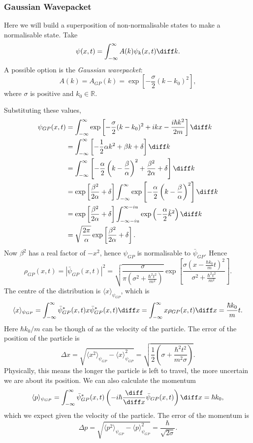 \documentclass[12pt]{article}
\begin{document}
\subsubsection{Gaussian Wavepacket}%
\label{subsub:gaussian_wavepacket}

Here we will build a superposition of non-normalisable states to make a normalisable state. Take
\[
	\psi(x, t) = \int_{-\infty}^{\infty} A(k) \psi_k(x, t) \diff k
.\]
A possible option is the \textit{Gaussian wavepacket}:
\[
	A(k) = A_{GP}(k) = \exp \left[ - \frac{\sigma}{2} (k - k_0)^2 \right]
,\]
where $\sigma$ is positive and $k_0 \in \mathbb{R}$.

Substituting these values,
\begin{align*}
	\psi_{GP}(x, t) &= \int_{-\infty}^{\infty} \exp \left[ - \frac{\sigma}{2}(k - k_0)^2 + i k x - \frac{i \hbar k^2}{2m} \right]\diff k \\
			&= \int_{-\infty}^{\infty} \left[-\frac{1}{2}\alpha k^2 + \beta k + \delta\right]\diff k \\
			&= \int_{-\infty}^{\infty} \left[ - \frac{\alpha}{2}\left(k - \frac{\beta}{\alpha}\right)^2 + \frac{\beta^2}{2\alpha} + \delta\right] \diff k \\
			&= \exp\left[ \frac{\beta^2}{2\alpha} + \delta \right] \int_{-\infty}^{\infty} \exp \left[- \frac{\alpha}{2} \left(k - \frac{\beta}{\alpha}\right)^2\right]\diff k \\
			&= \exp \left[ \frac{\beta^2}{2\alpha} + \delta \right] \int_{-\infty - iu}^{\infty - iu} \exp\left( - \frac{\alpha}{2} \tilde k^2\right) \diff k \\
			&= \sqrt{\frac{2\pi}{\alpha}} \exp\left[\frac{\beta^2}{2\alpha} + \delta\right].
\end{align*}
Now $\beta^2$ has a real factor of $-x^2$, hence $\psi_{GP}$ is normalisable to $\bar \psi_{GP}$. Hence
\[
	\rho_{GP}(x,t) = |\bar\psi_{GP}(x, t)|^2 = \sqrt{\frac{\sigma}{\pi(\sigma^2 + \frac{\hbar^2t^2}{m^2})}} \exp\left[\frac{\sigma(x - \frac{\hbar k_0}{m}t)^2}{\sigma^2 + \frac{\hbar^2t^2}{m^2}} \right]
.\]
The centre of the distribution is $\langle x \rangle_{\psi_{GP}}$, which is
\[
	\langle x \rangle_{\psi_{GP}} = \int_{-\infty}^{\infty} \bar \psi^{\ast}_{GP}(x, t) x \bar \psi_{GP}^{\ast}(x, t) \diff x = \int_{-\infty}^{\infty} x \rho_{GP}(x, t) \diff x = \frac{\hbar k_0}{m}t
.\]
Here $\hbar k_0/m$ can be though of as the velocity of the particle. The error of the position of the particle is
\[
	\Delta x = \sqrt{\langle x^2 \rangle_{\psi_{GP}} - \langle x \rangle^2_{\psi_{GP}}} = \sqrt{\frac{1}{2} \left(\sigma + \frac{\hbar^2t^2}{m^2 \sigma}\right)}
.\]
Physically, this means the longer the particle is left to travel, the more uncertain we are about its position. We can also calculate the momentum
\[
	\langle p \rangle_{\psi_{GP}} = \int_{-\infty}^{\infty} \bar \psi_{GP}^{\ast}(x, t) \left( - i \hbar \frac{\diff}{\diff x} \bar \psi_{GP}(x, t) \right) \diff x = \hbar k_0
,\]
which we expect given the velocity of the particle. The error of the momentum is
\[
	\Delta p = \sqrt{\langle p^2 \rangle_{\psi_{GP}} - \langle p \rangle_{\psi_{GP}}^{2}} = \frac{\hbar}{\sqrt{2 \sigma}}
.\]
\end{document}
